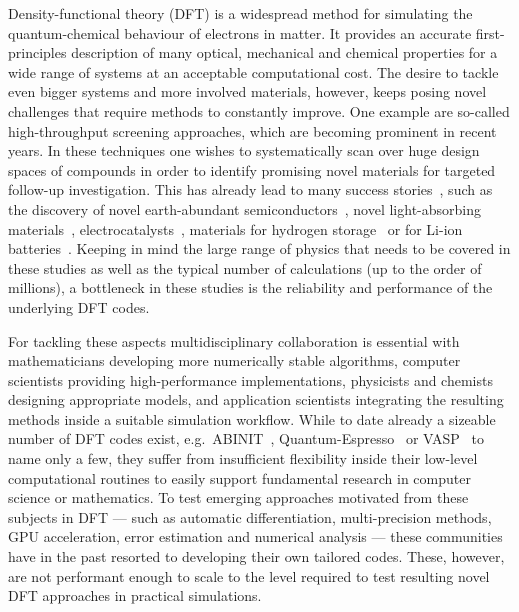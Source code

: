 \documentclass{juliacon}
\begin{document}


\maketitle

Density-functional theory (DFT) is a widespread method for simulating the
quantum-chemical behaviour of electrons in matter.
It provides an accurate first-principles description of
many optical, mechanical and chemical properties
for a wide range of systems at an acceptable computational cost.
The desire to tackle even bigger systems and
more involved materials, however, keeps posing novel challenges
that require methods to constantly improve.
One example are so-called high-throughput screening approaches,
which are becoming prominent in recent years.
In these techniques one
wishes to systematically scan over huge design spaces of compounds
in order to identify promising novel materials
for targeted follow-up investigation.
This has already lead to many success stories~\cite{Jain2016},
such as the discovery of
novel earth-abundant semiconductors~\cite{Hinuma2016},
novel light-absorbing materials~\cite{Zhao2017},
electrocatalysts~\cite{Greeley2006},
materials for hydrogen storage~\cite{Hummelshoj2009}
or for Li-ion batteries~\cite{Ahmad2018}.
Keeping in mind the large range of physics that needs
to be covered in these studies as well as
the typical  number of calculations (up to the order of millions),
a bottleneck in these studies
is the reliability and performance
of the underlying DFT codes.
\vskip 6pt

For tackling these aspects
multidisciplinary collaboration is essential with
mathematicians developing more numerically stable algorithms,
computer scientists providing high-performance implementations,
physicists and chemists designing appropriate models,
and application scientists integrating the resulting methods
inside a suitable simulation workflow.
While to date already a sizeable number of DFT codes exist,
e.g.~ABINIT~\cite{Romero2020}, Quantum-Espresso~\cite{Giannozzi2020}
or VASP~\cite{VASP} to name only a few,
they suffer from insufficient flexibility inside
their low-level computational routines
to easily support fundamental research
in computer science or mathematics.
To test emerging approaches motivated from these subjects in DFT
---
such as automatic differentiation, multi-precision methods,
GPU acceleration, error estimation and numerical analysis
---
these communities have in the past resorted
to developing their own tailored codes.
These, however, are not performant enough
to scale to the level required to test
resulting novel DFT approaches in practical simulations.
\vskip 6pt
\end{document}
